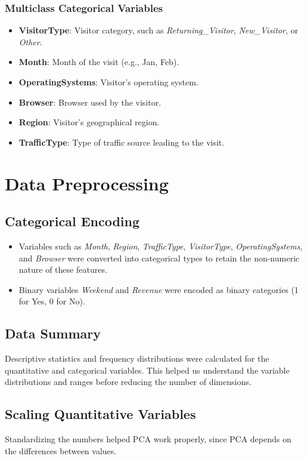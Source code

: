 \documentclass[a4paper, 12pt]{article}
\begin{document}
\subsubsection{Multiclass Categorical Variables}
\begin{itemize}
    \item \textbf{VisitorType}: Visitor category, such as \textit{Returning\_Visitor}, \textit{New\_Visitor}, or \textit{Other}.
    \item \textbf{Month}: Month of the visit (e.g., Jan, Feb).
    \item \textbf{OperatingSystems}: Visitor’s operating system.
    \item \textbf{Browser}: Browser used by the visitor.
    \item \textbf{Region}: Visitor’s geographical region.
    \item \textbf{TrafficType}: Type of traffic source leading to the visit.
\end{itemize}

\section{Data Preprocessing}

\subsection{Categorical Encoding}
\begin{itemize}
    \item Variables such as \textit{Month}, \textit{Region}, \textit{TrafficType}, \textit{VisitorType}, \textit{OperatingSystems}, and \textit{Browser} were converted into categorical types to retain the non-numeric nature of these features.
    \item Binary variables \textit{Weekend} and \textit{Revenue} were encoded as binary categories (1 for Yes, 0 for No).
\end{itemize}

\subsection{Data Summary}
Descriptive statistics and frequency distributions were calculated for the quantitative and categorical variables. This helped us understand the variable distributions and ranges before reducing the number of dimensions.

\subsection{Scaling Quantitative Variables}
Standardizing the numbers helped PCA work properly, since PCA depends on the differences between values.
\end{document}
